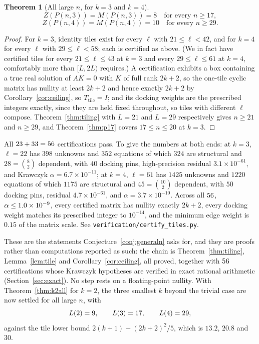 \documentclass[11pt]{article}
\newtheorem{theorem}{Theorem}
\theoremstyle{definition}
\begin{document}
\begin{theorem}[All large $n$, for $k=3$ and $k=4$]\label{thm:k3all}
\[
  Z(P(n,3))=M(P(n,3))=8 \quad\text{for every } n\ge17,
\]
\[
  Z(P(n,4))=M(P(n,4))=10 \quad\text{for every } n\ge29 .
\]
\end{theorem}

\begin{proof}
For $k=3$, identity tiles exist for every $\ell$ with $21\le\ell<42$, and for
$k=4$ for every $\ell$ with $29\le\ell<58$; each is certified as above.
(We in fact have certified tiles for every $21\le\ell\le43$ at $k=3$ and every
$29\le\ell\le61$ at $k=4$, comfortably more than $[L,2L)$ requires.) A
certification exhibits a box containing a true real solution of $AK=0$ with $K$
of full rank $2k+2$, so the one-tile cyclic matrix has nullity at least $2k+2$
and hence exactly $2k+2$ by Corollary~\ref{cor:ceiling}, so
$T_{\text{tile}}=I$; and its docking weights are the prescribed integers
exactly, since they are held fixed throughout, so tiles with different $\ell$
compose. Theorem~\ref{thm:tiling} with $L=21$ and $L=29$ respectively gives
$n\ge21$ and $n\ge29$, and Theorem~\ref{thm:p17} covers $17\le n\le20$ at $k=3$.
\end{proof}

\noindent
All $23+33=56$ certifications pass. To give the numbers at both ends: at $k=3$,
$\ell=22$ has $398$ unknowns and $352$ equations of which $324$ are structural
and $28=\binom82$ dependent, with $40$ docking pins, high-precision residual
$3.1\times10^{-61}$, and Krawczyk $\alpha=6.7\times10^{-11}$; at $k=4$,
$\ell=61$ has $1425$ unknowns and $1220$ equations of which $1175$ are
structural and $45=\binom{10}2$ dependent, with $50$ docking pins, residual
$4.7\times10^{-61}$, and $\alpha=3.7\times10^{-10}$. Across all
$56$, $\alpha\le1.0\times10^{-9}$, every certified matrix has nullity
exactly
$2k+2$, every docking weight matches its prescribed integer to $10^{-14}$, and
the minimum edge weight is $0.15$ of the matrix scale. See
\texttt{verification/certify\_tiles.py}.

These are the statements Conjecture~\ref{conj:generaln} asks for, and they are
proofs rather than computations reported as such: the chain is
Theorem~\ref{thm:tiling}, Lemma~\ref{lem:tile} and
Corollary~\ref{cor:ceiling}, all proved, together with $56$ certifications
whose Krawczyk hypotheses are verified in exact rational arithmetic
(Section~\ref{sec:exact}). No step rests on a floating-point nullity. With
Theorem~\ref{thm:k2all} for $k=2$, the three smallest $k$ beyond the trivial
case are now settled for all large $n$, with
\[
  L(2)=9,\qquad L(3)=17,\qquad L(4)=29 ,
\]
against the tile lower bound $2(k+1)+(2k+2)^{2}/5$, which is $13.2$, $20.8$ and
$30$.
\end{document}
